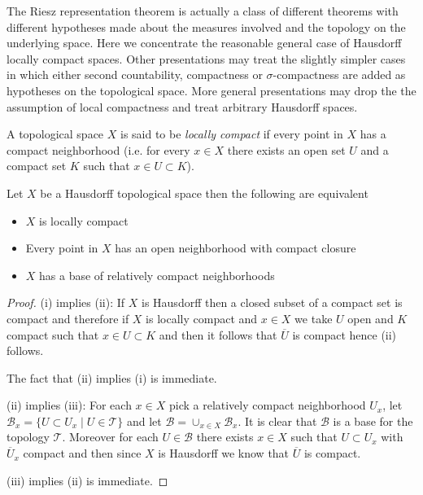 The Riesz representation theorem is actually a class of different
theorems with different hypotheses made about the measures involved
and the topology on the
underlying space.  Here we concentrate the reasonable general case of
Hausdorff locally compact spaces.  Other presentations may treat the
slightly simpler cases in which either second countability,
compactness or
$\sigma$-compactness are added as hypotheses on the topological space.  More general
presentations may drop the the assumption of local compactness and treat
arbitrary Hausdorff spaces.  

\begin{defn}A topological space $X$ is said to be \emph{locally
    compact} if every point in $X$ has a compact neighborhood
  (i.e. for every $x \in X$ there exists an open set $U$ and a compact
  set $K$ such that $x \in U \subset K$).
\end{defn}

\begin{lem}\label{LocallyCompactEquivalences}Let $X$ be a Hausdorff topological space then the following
  are equivalent
\begin{itemize}
\item[(i)]$X$ is locally compact
\item[(ii)]Every point in $X$ has an open neighborhood with compact closure
\item[(iii)]$X$ has a base of relatively compact neighborhoods
\end{itemize}
\end{lem}
\begin{proof}
(i) implies (ii):  If $X$ is Hausdorff then a closed subset of a compact set is compact
and therefore if $X$ is locally compact and $x \in X$ we take $U$ open
and $K$ compact such that $x \in U \subset K$ and then it follows that
$\overline{U}$ is compact hence (ii) follows.  

The fact that (ii) implies (i) is immediate.

(ii) implies (iii): For each $x \in X$ pick a relatively compact
neighborhood $U_x$, let $\mathcal{B}_x = \{ U \subset U_x \mid U
\in \mathcal{T} \}$ and let $\mathcal{B} = \cup_{x \in X}
\mathcal{B}_x$.  It is clear that $\mathcal{B}$ is a base for the
topology $\mathcal{T}$.  Moreover for each $U
\in \mathcal{B}$ there exists $x \in X$ such that $U \subset U_x$ with
$\overline{U}_x$ compact and then since $X$ is Hausdorff we know that
$\overline{U}$ is compact.

(iii) implies (ii) is immediate.
\end{proof}

